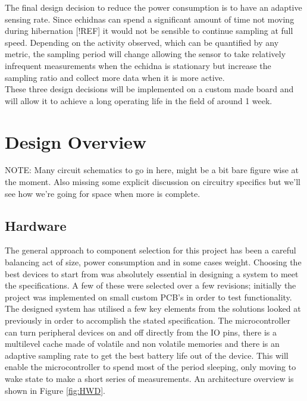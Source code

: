 \documentclass[12pt,openany,a4paper]{book}
\begin{document}
		The final design decision to reduce the power consumption is to have an adaptive sensing rate. Since echidnas can spend a significant amount of time not moving during hibernation [!REF] it would not be sensible to continue sampling at full speed. Depending on the activity observed, which can be quantified by any metric, the sampling period will change allowing the sensor to take relatively infrequent measurements when the echidna is stationary but increase the sampling ratio and collect more data when it is more active. \\
		
		These three design decisions will be implemented on a custom made board and will allow it to achieve a long operating life in the field of around 1 week.
		

\chapter{Design Overview}
	NOTE: Many circuit schematics to go in here, might be a bit bare figure wise at the moment. Also missing some explicit discussion on circuitry specifics but we'll see how we're going for space when more is complete. \\ \noindent\makebox[\linewidth]{\rule{\paperwidth}{0.4pt}}
	\noindent\makebox[\linewidth]{\rule{\paperwidth}{0.4pt}}
	
	\section{Hardware} \label{sec:components}
		The general approach to component selection for this project has been a careful balancing act of size, power consumption and in some cases weight. Choosing the best devices to start from was absolutely essential in designing a system to meet the specifications. A few of these were selected over a few revisions; initially the project was implemented on small custom PCB's in order to test functionality. \\
		
		The designed system has utilised a few key elements from the solutions looked at previously in order to accomplish the stated specification. The microcontroller can turn peripheral devices on and off directly from the IO pins, there is a multilevel cache made of volatile and non volatile memories and there is an adaptive sampling rate to get the best battery life out of the device. This will enable the microcontroller to spend most of the period sleeping, only moving to wake state to make a short series of measurements. An architecture overview is shown in Figure \ref{fig:HWD}.
		
\end{document}
